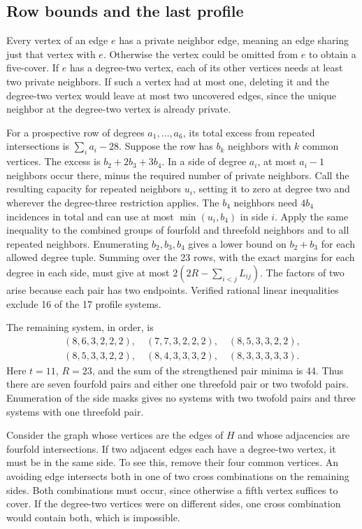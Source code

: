 \subsection{Row bounds and the last profile}

Every vertex of an edge $e$ has a private neighbor edge, meaning
an edge sharing just that vertex with $e$. Otherwise the vertex could
be omitted from $e$ to obtain a five-cover. If $e$ has a degree-two
vertex, each of its other vertices needs at least two private
neighbors. If such a vertex had at most one, deleting it and the
degree-two vertex would leave at most two uncovered edges, since the
unique neighbor at the degree-two vertex is already private.

For a prospective row of degrees $a_1,\ldots,a_6$, its total excess
from repeated intersections is $\sum_i a_i-28$. Suppose the row has
$b_k$ neighbors with $k$ common vertices. The excess is
$b_2+2b_3+3b_4$. In a side of degree $a_i$, at most $a_i-1$ neighbors
occur there, minus the required number of private neighbors.
Call the resulting capacity for repeated neighbors $u_i$, setting
it to zero at degree two and wherever the degree-three restriction
applies. The $b_4$ neighbors need $4b_4$ incidences in total and
can use at most $\min(u_i,b_4)$ in side $i$. Apply the same inequality
to the combined groups of fourfold and threefold neighbors and to all
repeated neighbors. Enumerating $b_2,b_3,b_4$ gives a lower bound on
$b_2+b_3$ for each allowed degree tuple. Summing over the 23 rows,
with the exact margins for each degree in each side, must give
at most $2(2R-\sum_{i<j}L_{ij})$. The factors of two arise because
each pair has two endpoints. Verified rational linear inequalities
exclude 16 of the 17 profile systems.

The remaining system, in order, is
\[
\begin{gathered}
(8,6,3,2,2,2),\quad (7,7,3,2,2,2),\quad
(8,5,3,3,2,2),\\
(8,5,3,3,2,2),\quad
(8,4,3,3,3,2),\quad (8,3,3,3,3,3).
\end{gathered}
\]
Here $t=11$, $R=23$, and the sum of the strengthened pair minima
is 44. Thus there are seven fourfold pairs and either one threefold
pair or two twofold pairs. Enumeration of the side masks gives no
systems with two twofold pairs and three systems with one threefold pair.

Consider the graph whose vertices are the edges of $H$ and whose
adjacencies are fourfold intersections. If two adjacent edges each
have a degree-two vertex, it must be in the same side. To see this,
remove their four common vertices. An avoiding edge intersects both
in one of two cross combinations on the remaining sides. Both
combinations must occur, since otherwise a fifth vertex suffices
to cover. If the degree-two vertices were on different sides, one
cross combination would contain both, which is impossible.

